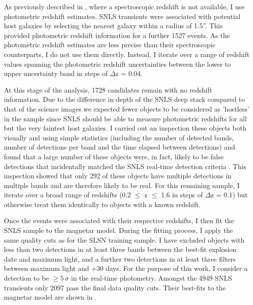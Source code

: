As previously described in , where a spectroscopic redshift is not available, I use photometric redshift estimates. SNLS transients were associated with potential host galaxies by selecting the nearest galaxy within a radius of 1.5''. This provided photometric redshift information for a further 1527 events. As the photometric redshift estimates are less precise than their spectroscopic counterparts, I do not use them directly. Instead, I iterate over a range of redshift values spanning the photometric redshift uncertainties between the lower to upper uncertainty band in steps of $\Delta$z = 0.04.

At this stage of the analysis, 1728 candidates remain with no redshift information. Due to the difference in depth of the SNLS deep stack compared to that of the science images we expected fewer objects to be considered as 'hostless' in the sample since SNLS should be able to measure photometric redshifts for all but the very faintest host galaxies. I carried out an inspection these objects both visually and using simple statistics (including the number of detected bands, number of detections per band and the time elapsed between detections) and found that a large number of these objects were, in fact, likely to be false detections that incidentally matched the SNLS real-time detection criteria \citep{Perrett2010}. This inspection showed that only 292 of these objects have multiple detections in multiple bands and are therefore likely to be real. For this remaining sample, I iterate over a broad range of redshifts (0.2 $\leq$ z $\leq$ 1.6 in steps of $\Delta$z = 0.1) but otherwise treat them identically to objects with a known redshift.

Once the events were associated with their respective redshifts, I then fit the SNLS sample to the magnetar model. During the fitting process, I apply the same quality cuts as for the SLSN training sample. I have excluded objects with less than two detections in at least three bands between the best-fit explosion date and maximum light, and a further two detections in at least three filters between maximum light and $+30$ days. For the purpose of this work, I consider a detection to be $\geq5$\,$\sigma$ in the real-time photometry. Amongst the 4949 SNLS transients only 2097 pass the final data quality cuts. Their best-fits to the magnetar model are shown in .

